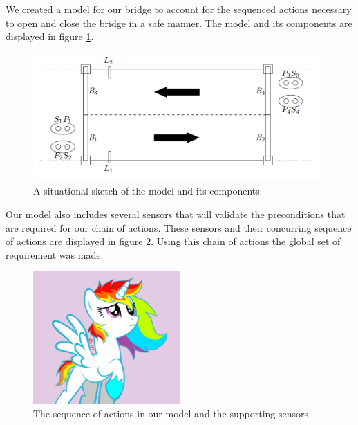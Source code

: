 
We created a model for our bridge to account for the sequenced actions necessary to open and close the bridge in a safe manner. The model and its components are displayed in figure \ref{fig:model}. 

\begin{figure}[!h]
\centering
\includegraphics[width=1\textwidth]{sketch.png}
\caption{A situational sketch of the model and its components}
\label{fig:model}
\end{figure}

Our model also includes several sensors that will validate the preconditions that are required for our chain of actions. These sensors and their concurring sequence of actions are displayed in figure \ref{fig:sequence}. Using this chain of actions the global set of requirement was made. 


\begin{figure}[!h]
\centering
\includegraphics[width=0.5\textwidth]{model.pdf}
\caption{The sequence of actions in our model and the supporting sensors}
\label{fig:sequence}
\end{figure}
